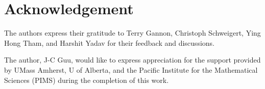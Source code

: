 \section*{Acknowledgement}

The authors express their gratitude to Terry Gannon, Christoph Schweigert,
Ying Hong Tham, and Harshit Yadav for their feedback and discussions.

The author, J-C Guu, would like to express appreciation for the support
provided by UMass Amherst, U of Alberta, and the Pacific Institute for the
Mathematical Sciences (PIMS) during the completion of this work.
